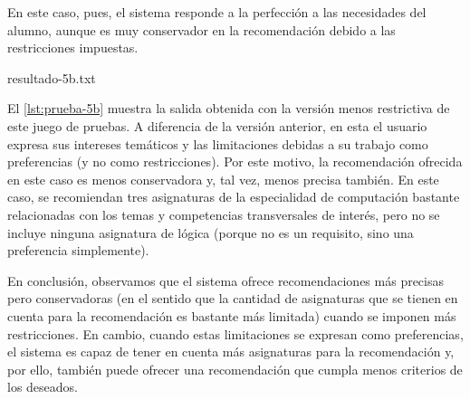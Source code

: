 En este caso, pues, el sistema responde a la perfección a las necesidades del 
alumno, aunque es muy conservador en la recomendación debido a las 
restricciones impuestas.

%
    {resultado-5b.txt}

El \autoref{lst:prueba-5b} muestra la salida obtenida con la versión menos 
restrictiva de este juego de pruebas. A diferencia de la versión anterior, en 
esta el usuario expresa sus intereses temáticos y las limitaciones debidas a 
su trabajo como preferencias (y no como restricciones). Por este motivo, la 
recomendación ofrecida en este caso es menos conservadora y, tal vez, menos 
precisa también. En este caso, se recomiendan tres asignaturas de la 
especialidad de computación bastante relacionadas con los temas y competencias 
transversales de interés, pero no se incluye ninguna asignatura de lógica 
(porque no es un requisito, sino una preferencia simplemente). 

En conclusión, observamos que el sistema ofrece recomendaciones más precisas 
pero conservadoras (en el sentido que la cantidad de asignaturas que se tienen 
en cuenta para la recomendación es bastante más limitada) cuando se imponen 
más restricciones. En cambio, cuando estas limitaciones se expresan como 
preferencias, el sistema es capaz de tener en cuenta más asignaturas para la 
recomendación y, por ello, también puede ofrecer una recomendación que cumpla 
menos criterios de los deseados.


